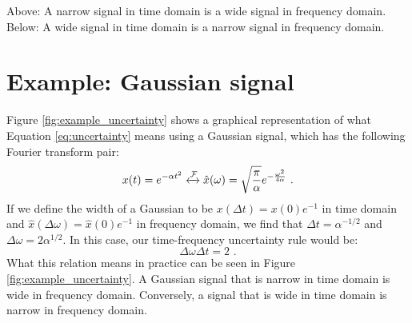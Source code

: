 \begin{marginfigure}
\begin{center}

  \end{center}
  \caption{Above: A narrow signal in time domain is a wide signal in frequency domain.
    Below: A wide signal in time domain is a narrow signal in frequency domain.}
  \label{fig:example_uncertainty}
\end{marginfigure}

\section{Example: Gaussian signal}
Figure \ref{fig:example_uncertainty} shows a graphical representation
of what Equation \ref{eq:uncertainty} means using a Gaussian signal,
which has the following Fourier transform pair:
\begin{equation}
  x(t) = e^{-\alpha t^2} \xleftrightarrow{\mathcal{F}} \hat{x}(\omega) = \sqrt{\frac{\pi}{\alpha}} e^{-\frac{\omega^2}{4\alpha}} \,\,.
\end{equation}
If we define the width of a Gaussian to be $x(\Delta t)=x(0)e^{-1}$ in
time domain and $\hat{x}(\Delta \omega)=\hat{x}(0)e^{-1}$ in frequency
domain, we find that $\Delta t = \alpha^{-1/2}$ and $\Delta \omega
  = 2\alpha^{1/2}$. In this case, our time-frequency uncertainty rule would be:
\begin{equation}
  \Delta \omega \Delta t  = 2 \,\,.
\end{equation}
What this relation means in practice can be seen in
Figure \ref{fig:example_uncertainty}. A Gaussian signal that is narrow
in time domain is wide in frequency domain. Conversely, a signal that
is wide in time domain is narrow in frequency domain.


